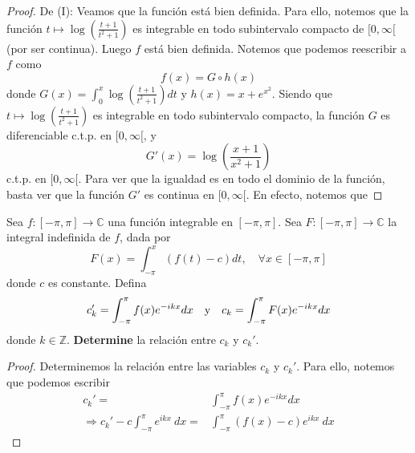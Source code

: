 \documentclass[12pt]{report}
\theoremstyle{largebreak}
\newcommand\cf[3]{\ensuremath{#1:#2\rightarrow#3}}
\begin{document}
    \begin{proof}
        De (I): Veamos que la función está bien definida. Para ello, notemos que la función $t\mapsto\log\left(\frac{t+1}{t^2+1}\right)$ es integrable en todo subintervalo compacto de $[0,\infty[$ (por ser continua). Luego $f$ está bien definida. Notemos que podemos reescribir a $f$ como
        \begin{equation}
            f(x)=G\circ h(x)
        \end{equation}
        donde $G(x)=\int_{0}^{x}\log\left(\frac{t+1}{t^2+1}\right)dt$ y $h(x)=x+e^{x^2}$. Siendo que $t\mapsto\log\left(\frac{t+1}{t^2+1}\right)$ es integrable en todo subintervalo compacto, la función $G$ es diferenciable c.t.p. en $[0,\infty[$, y
        \begin{equation*}
            G'(x)=\log\left(\frac{x+1}{x^2+1}\right)
        \end{equation*}
        c.t.p. en $[0,\infty[$. Para ver que la igualdad es en todo el dominio de la función, basta ver que la función $G'$ es continua en $[0,\infty[$. En efecto, notemos que
    \end{proof}

    \begin{excer}
        Sea $\cf{f}{[-\pi, \pi]}{\mathbb{C}}$ una función integrable en $[-\pi, \pi]$. Sea $\cf{F}{[-\pi, \pi]}{\mathbb{C}}$ la integral indefinida de $f$, dada por
        \begin{equation*}
            F(x)=\int_{-\pi}^{x}\left(f(t)-c\right)dt,\quad\forall x\in[-\pi, \pi]
        \end{equation*}
        donde $c$ es constante. Defina
        \begin{equation*}
            c_k'=\int_{-\pi}^{\pi}f(x)e^{-ikx}dx\quad\textup{y}\quad c_k=\int_{-\pi}^{\pi}F(x)e^{-ikx}dx
        \end{equation*}
        donde $k\in\mathbb{Z}$. \textbf{Determine} la relación entre $c_k$ y $c_k'$.
    \end{excer}

    \begin{proof}
        Determinemos la relación entre las variables $c_k$ y $c_k'$. Para ello, notemos que podemos escribir
        \begin{equation*}
            \begin{split}
                c_k' = & \int_{-\pi}^{\pi}f(x)e^{-ikx}dx\\
				\Rightarrow c_k'-c \int_{{-\pi}}^{{\pi}} {e^{ikx}} \: d{x}=&\int_{{-\pi}}^{{\pi}} {\left(f(x)-c\right)e^{ikx}} \: d{x}
            \end{split}
        \end{equation*}        
    \end{proof}
\end{document}
